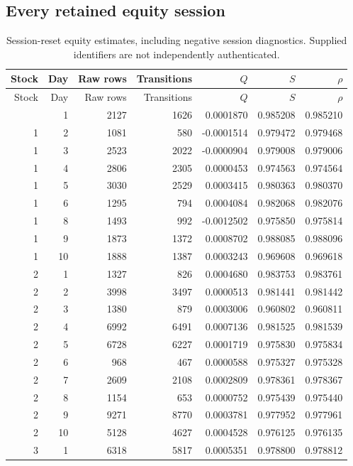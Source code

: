 \subsection{Every retained equity session}
\begin{longtable}{rrrrrrr}
\caption{Session-reset equity estimates, including negative session diagnostics. Supplied identifiers are not independently authenticated.}\\
\toprule Stock & Day & Raw rows & Transitions & $Q$ & $S$ & $\rho$\\\midrule\endfirsthead
\toprule Stock & Day & Raw rows & Transitions & $Q$ & $S$ & $\rho$\\\midrule\endhead
\bottomrule\endfoot
1 & 1 & 2127 & 1626 & 0.0001870 & 0.985208 & 0.985210\\
1 & 2 & 1081 & 580 & -0.0001514 & 0.979472 & 0.979468\\
1 & 3 & 2523 & 2022 & -0.0000904 & 0.979008 & 0.979006\\
1 & 4 & 2806 & 2305 & 0.0000453 & 0.974563 & 0.974564\\
1 & 5 & 3030 & 2529 & 0.0003415 & 0.980363 & 0.980370\\
1 & 6 & 1295 & 794 & 0.0004084 & 0.982068 & 0.982076\\
1 & 8 & 1493 & 992 & -0.0012502 & 0.975850 & 0.975814\\
1 & 9 & 1873 & 1372 & 0.0008702 & 0.988085 & 0.988096\\
1 & 10 & 1888 & 1387 & 0.0003243 & 0.969608 & 0.969618\\
2 & 1 & 1327 & 826 & 0.0004680 & 0.983753 & 0.983761\\
2 & 2 & 3998 & 3497 & 0.0000513 & 0.981441 & 0.981442\\
2 & 3 & 1380 & 879 & 0.0003006 & 0.960802 & 0.960811\\
2 & 4 & 6992 & 6491 & 0.0007136 & 0.981525 & 0.981539\\
2 & 5 & 6728 & 6227 & 0.0001719 & 0.975830 & 0.975834\\
2 & 6 & 968 & 467 & 0.0000588 & 0.975327 & 0.975328\\
2 & 7 & 2609 & 2108 & 0.0002809 & 0.978361 & 0.978367\\
2 & 8 & 1154 & 653 & 0.0000752 & 0.975439 & 0.975440\\
2 & 9 & 9271 & 8770 & 0.0003781 & 0.977952 & 0.977961\\
2 & 10 & 5128 & 4627 & 0.0004528 & 0.976125 & 0.976135\\
3 & 1 & 6318 & 5817 & 0.0005351 & 0.978800 & 0.978812\\

\end{longtable}
